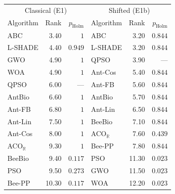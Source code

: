 \begin{tabular}{lrrlrr}
\toprule
\multicolumn{3}{c}{Classical (E1)} & \multicolumn{3}{c}{Shifted (E1b)} \\
Algorithm & Rank & $p_{\mathrm{Holm}}$ & Algorithm & Rank & $p_{\mathrm{Holm}}$ \\
\midrule
ABC & 3.40 & $1$ & ABC & 3.20 & $0.844$ \\
L-SHADE & 4.40 & $0.949$ & L-SHADE & 3.20 & $0.844$ \\
GWO & 4.90 & $1$ & QPSO & 3.90 & --- \\
WOA & 4.90 & $1$ & Ant-Cos & 5.40 & $0.844$ \\
QPSO & 6.00 & --- & Ant-FB & 5.60 & $0.844$ \\
AntBio & 6.60 & $1$ & AntBio & 5.70 & $0.844$ \\
Ant-FB & 6.80 & $1$ & Ant-Lin & 6.50 & $0.844$ \\
Ant-Lin & 7.50 & $1$ & BeeBio & 7.10 & $0.844$ \\
Ant-Cos & 8.00 & $1$ & ACO$_\mathbb{R}$ & 7.60 & $0.439$ \\
ACO$_\mathbb{R}$ & 9.30 & $1$ & Bee-PP & 7.80 & $0.844$ \\
BeeBio & 9.40 & $0.117$ & PSO & 11.30 & $0.023$ \\
PSO & 9.50 & $0.273$ & GWO & 11.50 & $0.023$ \\
Bee-PP & 10.30 & $0.117$ & WOA & 12.20 & $0.023$ \\
\bottomrule
\end{tabular}
